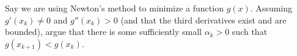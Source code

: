 \documentclass[12pt, leqno]{article}
\begin{document}

Say we are using Newton's method to minimize a function $g(x)$.
Assuming $g'(x_k)\neq 0$ and $g''(x_k) > 0$ (and that the third
derivatives exist and are bounded),
argue that there is some sufficiently small
$\alpha_k > 0$ such that $g(x_{k+1}) < g(x_k)$.
\end{document}
